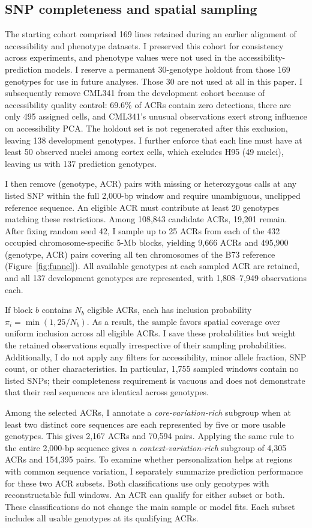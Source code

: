 \documentclass[10pt]{article}
\begin{document}
\subsection{SNP completeness and spatial sampling}

The starting cohort comprised 169 lines retained during an earlier alignment of accessibility and phenotype datasets. I preserved this cohort for consistency across experiments, and phenotype values were not used in the accessibility-prediction models. I reserve a permanent 30-genotype holdout from those 169 genotypes for use in future analyses. Those 30 are not used at all in this paper. I subsequently remove CML341 from the development cohort because of accessibility quality control: 69.6\% of ACRs contain zero detections, there are only 495 assigned cells, and CML341's unusual observations exert strong influence on accessibility PCA. The holdout set is not regenerated after this exclusion, leaving 138 development genotypes. I further enforce that each line must have at least 50 observed nuclei among cortex cells, which excludes H95 (49 nuclei), leaving us with 137 prediction genotypes. 

I then remove (genotype, ACR) pairs with missing or heterozygous calls at any listed SNP within the full 2,000-bp window and require unambiguous, unclipped reference sequence. An eligible ACR must contribute at least 20 genotypes matching these restrictions. Among 108,843 candidate ACRs, 19,201 remain. After fixing random seed 42, I sample up to 25 ACRs from each of the 432 occupied chromosome-specific 5-Mb blocks, yielding 9,666 ACRs and 495,900 (genotype, ACR) pairs covering all ten chromosomes of the B73 reference (Figure~\ref{fig:funnel}). All available genotypes at each sampled ACR are retained, and all 137 development genotypes are represented, with 1,808--7,949 observations each.

If block $b$ contains $N_b$ eligible ACRs, each has inclusion probability $\pi_i=\min(1,25/N_b)$. As a result, the sample favors spatial coverage over uniform inclusion across all eligible ACRs. I save these probabilities but weight the retained observations equally irrespective of their sampling probabilities. Additionally, I do not apply any filters for accessibility, minor allele fraction, SNP count, or other characteristics. In particular, 1,755 sampled windows contain no listed SNPs; their completeness requirement is vacuous and does not demonstrate that their real sequences are identical across genotypes.

Among the selected ACRs, I annotate a \emph{core-variation-rich} subgroup when at least two distinct core sequences are each represented by five or more usable genotypes. This gives 2,167 ACRs and 70,594 pairs. Applying the same rule to the entire 2,000-bp sequence gives a \emph{context-variation-rich} subgroup of 4,305 ACRs and 154,395 pairs. To examine whether personalization helps at regions with common sequence variation, I separately summarize prediction performance for these two ACR subsets. Both classifications use only genotypes with reconstructable full windows. An ACR can qualify for either subset or both. These classifications do not change the main sample or model fits. Each subset includes all usable genotypes at its qualifying ACRs.
\end{document}
